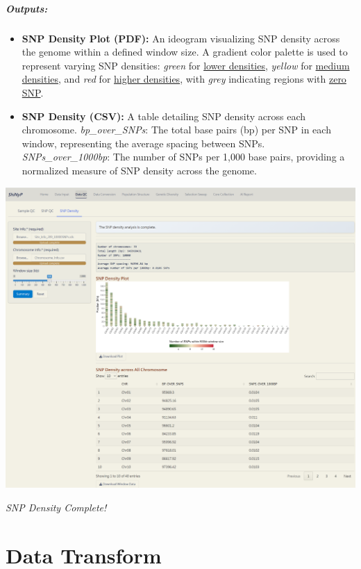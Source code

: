 \documentclass[
]{book}
\begin{document}
\paragraph*{Outputs:}\label{outputs-3}

\begin{itemize}
\item
  \textbf{SNP Density Plot (PDF):} An ideogram visualizing SNP density across the genome within a defined window size. A gradient color palette is used to represent varying SNP densities: \emph{green} for \ul{lower densities}, \emph{yellow} for \ul{medium densities}, and \emph{red} for \ul{higher densities}, with \emph{grey} indicating regions with \ul{zero SNP}.
\item
  \textbf{SNP Density (CSV):} A table detailing SNP density across each chromosome. \emph{bp\_over\_SNPs}: The total base pairs (bp) per SNP in each window, representing the average spacing between SNPs. \emph{SNPs\_over\_1000bp}: The number of SNPs per 1,000 base pairs, providing a normalized measure of SNP density across the genome.
\end{itemize}

\includegraphics[width=8.33333in,height=\textheight]{images/clipboard-3331950775.png}

\emph{SNP Density Complete!}

\chapter{Data Transform}\label{sec-data-conversion}
\end{document}
